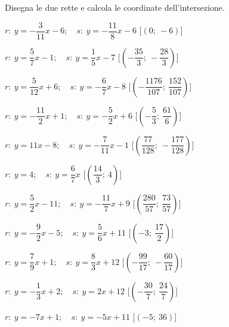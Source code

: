 \begin{esercizio}\label{ese:}
 Disegna le due rette e calcola le coordinate dell'intersezione.
 \begin{enumeratea}
  \item  $r:~y = -\dfrac{3}{11} x -6;\quad s:~y = -\dfrac{11}{8} x -6$ 
\hfill    [$\left(0;~-6\right)$]
  \item  $r:~y = \dfrac{5}{7} x -1;\quad s:~y = \dfrac{1}{5} x -7$ 
    \hfill    [$\left(-\dfrac{35}{3};~-\dfrac{28}{3}\right)$]
  \item  $r:~y = \dfrac{5}{12} x +6;\quad s:~y = -\dfrac{6}{7} x -8$ 
    \hfill    [$\left(-\dfrac{1176}{107};~\dfrac{152}{107}\right)$]
  \item  $r:~y = -\dfrac{11}{2} x +1;\quad s:~y = -\dfrac{5}{2} x +6$ 
\hfill    [$\left(-\dfrac{5}{3};~\dfrac{61}{6}\right)$]
  \item  $r:~y = 11 x -8;\quad s:~y = -\dfrac{7}{11} x -1$ 
    \hfill    [$\left(\dfrac{77}{128};~-\dfrac{177}{128}\right)$]
  \item  $r:~y = 4;\quad s:~y = \dfrac{6}{7} x $ \hfill 
   [$\left(\dfrac{14}{3};~4\right)$]
  \item  $r:~y = \dfrac{5}{2} x -11;\quad s:~y = -\dfrac{11}{7} x +9$ 
\hfill    [$\left(\dfrac{280}{57};~\dfrac{73}{57}\right)$]
  \item  $r:~y = -\dfrac{9}{2} x -5;\quad s:~y = \dfrac{5}{6} x +11$ 
    \hfill    [$\left(-3;~\dfrac{17}{2}\right)$]
  \item  $r:~y = \dfrac{7}{9} x +1;\quad s:~y = \dfrac{8}{3} x +12$ 
    \hfill    [$\left(-\dfrac{99}{17};~-\dfrac{60}{17}\right)$]
  \item  $r:~y = -\dfrac{1}{3} x +2;\quad s:~y = 2 x +12$ 
    \hfill    [$\left(-\dfrac{30}{7};~\dfrac{24}{7}\right)$]
  \item  $r:~y = -7 x +1;\quad s:~y = -5 x +11$ 
    \hfill    [$\left(-5;~36\right)$]

\end{enumeratea}
\end{esercizio}
